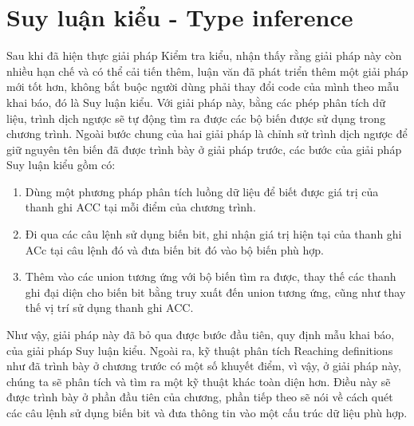 \section{Suy luận kiểu - Type inference}
Sau khi đã hiện thực giải pháp Kiểm tra kiểu, nhận thấy rằng giải pháp này còn nhiều hạn chế và có thể cải tiến thêm, luận văn đã phát triển thêm một giải pháp mới tốt hơn, không bắt buộc người dùng phải thay đổi code của mình theo mẫu khai báo, đó là Suy luận kiểu. Với giải pháp này, bằng các phép phân tích dữ liệu, trình dịch ngược sẽ tự động tìm ra được các bộ biến được sử dụng trong chương trình. Ngoài bước chung của hai giải pháp là chỉnh sử trình dịch ngược để giữ nguyên tên biến đã được trình bày ở giải pháp trước, các bước của giải pháp Suy luận kiểu gồm có:
\begin{enumerate}
	\item Dùng một phương pháp phân tích luồng dữ liệu để biết được giá trị của thanh ghi ACC tại mỗi điểm của chương trình.
	\item Đi qua các câu lệnh sử dụng biến bit, ghi nhận giá trị hiện tại của thanh ghi ACc tại câu lệnh đó và đưa biến bit đó vào bộ biến phù hợp.
	\item Thêm vào các union tương ứng với bộ biến tìm ra được, thay thế các thanh ghi đại diện cho biến bit bằng truy xuất đến union tương ứng, cũng như thay thế vị trí sử dụng thanh ghi ACC.
\end{enumerate}
Như vậy, giải pháp này đã bỏ qua được bước đầu tiên, quy định mẫu khai báo, của giải pháp Suy luận kiểu. Ngoài ra, kỹ thuật phân tích Reaching definitions như đã trình bày ở chương trước có một số khuyết điểm, vì vậy, ở giải pháp này, chúng ta sẽ phân tích và tìm ra một kỹ thuật khác toàn diện hơn. Điều này sẽ được trình bày ở phần đầu tiên của chương, phần tiếp theo sẽ nói về cách quét các câu lệnh sử dụng biến bit và đưa thông tin vào một cấu trúc dữ liệu phù hợp.

